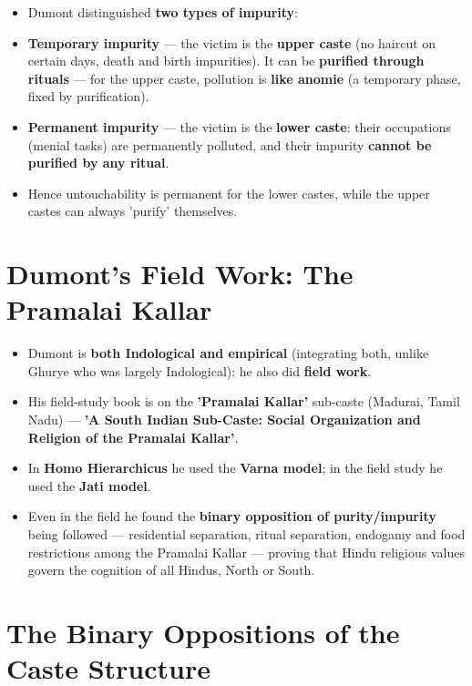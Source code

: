 \begin{KeyConcept}
\begin{itemize}
\item Dumont distinguished \textbf{two types of impurity}:
\item \textbf{Temporary impurity} --- the victim is the \textbf{upper caste} (no haircut on certain days, death and birth impurities). It can be \textbf{purified through rituals} --- for the upper caste, pollution is \textbf{like anomie} (a temporary phase, fixed by purification).
\item \textbf{Permanent impurity} --- the victim is the \textbf{lower caste}: their occupations (menial tasks) are permanently polluted, and their impurity \textbf{cannot be purified by any ritual}.
\item Hence untouchability is permanent for the lower castes, while the upper castes can always 'purify' themselves.
\end{itemize}
\end{KeyConcept}

\section{Dumont's Field Work: The Pramalai Kallar}

\begin{KeyConcept}
\begin{itemize}
\item Dumont is \textbf{both Indological and empirical} (integrating both, unlike Ghurye who was largely Indological): he also did \textbf{field work}.
\item His field-study book is on the \textbf{'Pramalai Kallar'} sub-caste (Madurai, Tamil Nadu) --- \textbf{'A South Indian Sub-Caste: Social Organization and Religion of the Pramalai Kallar'}.
\item In \textbf{Homo Hierarchicus} he used the \textbf{Varna model}; in the field study he used the \textbf{Jati model}.
\item Even in the field he found the \textbf{binary opposition of purity/impurity} being followed --- residential separation, ritual separation, endogamy and food restrictions among the Pramalai Kallar --- proving that Hindu religious values govern the cognition of all Hindus, North or South.
\end{itemize}
\end{KeyConcept}

\section{The Binary Oppositions of the Caste Structure}

